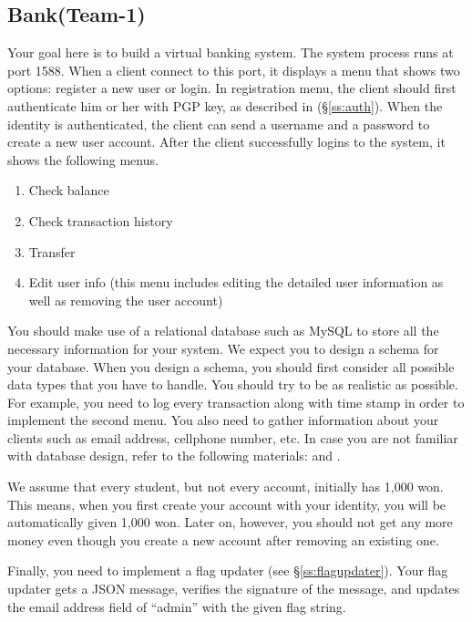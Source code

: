 \documentclass[a4paper, 11pt]{article}
\newcommand*{\Modone}{Bank\xspace}%
\theoremstyle{definition}
\begin{document}
{\subsection{\Modone (Team-1)} \label{ss:modone}

Your goal here is to build a virtual banking system. The system
process runs at port 1588. When a client connect to this port, it
displays a menu that shows two options: register a new user or login.
In registration menu, the client should first authenticate him or her
with PGP key, as described in (\S\ref{ss:auth}). When the identity is
authenticated, the client can send a username and a password to create
a new user account. After the client successfully logins to the
system, it shows the following menus.

\begin{enumerate}
  \item Check balance
  \item Check transaction history
  \item Transfer
  \item Edit user info (this menu includes editing the detailed user
    information as well as removing the user account)
\end{enumerate}

You should make use of a relational database such as MySQL to store
all the necessary information for your system. We expect you to design
a schema for your database. When you design a schema, you should first
consider all possible data types that you have to handle. You should
try to be as realistic as possible. For example, you need to log every
transaction along with time stamp in order to implement the second
menu. You also need to gather information about your clients such as
email address, cellphone number, etc.
%
In case you are not familiar with database design, refer to the
following materials: \cite{dbdesign} and \cite{dbtutorial}.

We assume that every student, but not every account, initially has
1,000 won. This means, when you first create your account with your
identity, you will be automatically given 1,000 won. Later on,
however, you should not get any more money even though you create a
new account after removing an existing one.

Finally, you need to implement a flag updater (see
\S\ref{ss:flagupdater}). Your flag updater gets a JSON message,
verifies the signature of the message, and updates the email address
field of ``admin'' with the given flag string.

}
\end{document}
